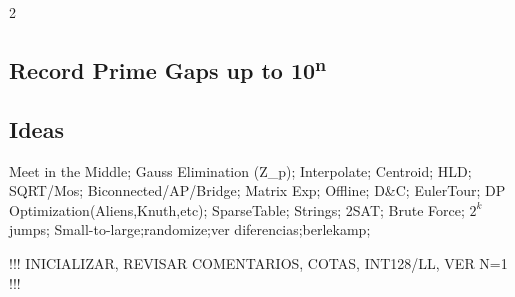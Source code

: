 \begin{multicols}{2}
\subsection{Record Prime Gaps up to 10\textsuperscript{n}}

\subsection{Ideas}
Meet in the Middle; Gauss Elimination (Z\_p); Interpolate; Centroid; HLD;
SQRT/Mos; Biconnected/AP/Bridge; Matrix Exp; Offline; D\&C; EulerTour;
DP Optimization(Aliens,Knuth,etc); SparseTable; Strings; 2SAT;
Brute Force; $2^k$ jumps;
Small-to-large;randomize;ver diferencias;berlekamp;

!!! INICIALIZAR, REVISAR COMENTARIOS, COTAS, INT128/LL, VER N=1 !!!



\end{multicols}


